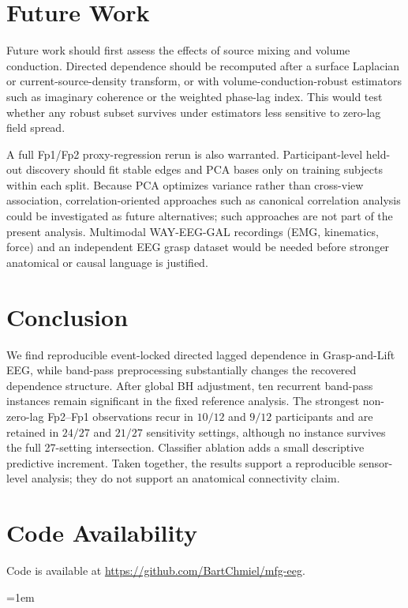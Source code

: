 \documentclass[10pt,journal]{IEEEtran}
\begin{document}
\section{Future Work}
Future work should first assess the effects of source mixing and volume conduction. Directed dependence should be recomputed after a surface Laplacian or current-source-density transform, or with volume-conduction-robust estimators such as imaginary coherence or the weighted phase-lag index. This would test whether any robust subset survives under estimators less sensitive to zero-lag field spread.

A full Fp1/Fp2 proxy-regression rerun is also warranted. Participant-level held-out discovery should fit stable edges and PCA bases only on training subjects within each split. Because PCA optimizes variance rather than cross-view association, correlation-oriented approaches such as canonical correlation analysis could be investigated as future alternatives; such approaches are not part of the present analysis. Multimodal WAY-EEG-GAL recordings (EMG, kinematics, force) and an independent EEG grasp dataset would be needed before stronger anatomical or causal language is justified.

\balance
\section{Conclusion}
We find reproducible event-locked directed lagged dependence in Grasp-and-Lift EEG, while band-pass preprocessing substantially changes the recovered dependence structure. After global BH adjustment, ten recurrent band-pass instances remain significant in the fixed reference analysis. The strongest non-zero-lag Fp2--Fp1 observations recur in $10/12$ and $9/12$ participants and are retained in $24/27$ and $21/27$ sensitivity settings, although no instance survives the full 27-setting intersection. Classifier ablation adds a small descriptive predictive increment. Taken together, the results support a reproducible sensor-level analysis; they do not support an anatomical connectivity claim.

\section{Code Availability}
Code is available at \url{https://github.com/BartChmiel/mfg-eeg}.


\begingroup
\raggedright
{}
\emergencystretch=1em
\endgroup
\end{document}
